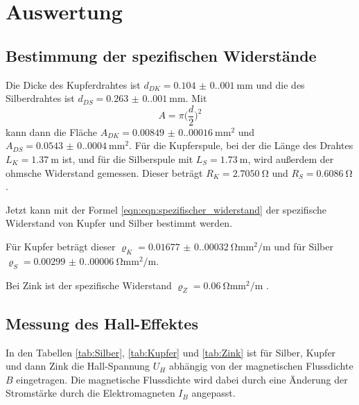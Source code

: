 \section{Auswertung}
\label{sec:Auswertung}

\subsection{Bestimmung der spezifischen Widerstände}
Die Dicke des Kupferdrahtes ist $d_{DK}=\qty{0.104(0.001)}{\milli\meter}$ und die des Silberdrahtes ist $d_{DS}=\qty{0.263(0.001)}{\milli\meter}$.
Mit 
\begin{equation}
  A=\pi \bigl(\frac{d}{2} \bigr)^2
\label{eqn:Querschnitt}
\end{equation}
\noindent 
kann dann die Fläche $A_{DK}=\qty{0.00849(0.00016)}{\milli\meter\squared}$ und $A_{DS}=\qty{0.0543(0.0004)}{\milli\meter\squared}$.
\noindent Für die Kupferspule, bei der die Länge des Drahtes $L_K=\qty{1.37}{\meter}$ ist, und für die Silberspule mit $L_S=\qty{1.73}{\meter}$, wird außerdem der ohmsche Widerstand gemessen.
Dieser beträgt $R_K=\qty{2.7050}{\ohm}$ und $R_S=\qty{0.6086}{\ohm}$.

\noindent Jetzt kann mit der Formel \ref{eqn:eqn:spezifischer_widerstand} der spezifische Widerstand von Kupfer und Silber bestimmt werden.


\noindent Für Kupfer beträgt dieser $\varrho_K=\qty{0.01677(0.00032)}{\ohm\milli\meter\squared\per\m}$ und für Silber $\varrho_S=\qty{0.00299(0.00006)}{\ohm\milli\meter\squared\per\m}$.

\noindent Bei Zink ist der spezifische Widerstand $\varrho_Z = \qty{0.06}{\ohm\milli\meter\squared\per\m}$ \cite{Zink}.


\subsection{Messung des Hall-Effektes}

In den Tabellen \ref{tab:Silber}, \ref{tab:Kupfer} und \ref{tab:Zink} ist für Silber, Kupfer und dann Zink die Hall-Spannung $U_H$ abhängig von der magnetischen Flussdichte $B$ eingetragen.
Die magnetische Flussdichte wird dabei durch eine Änderung der Stromstärke durch die Elektromagneten $I_B$ angepasst.
 

